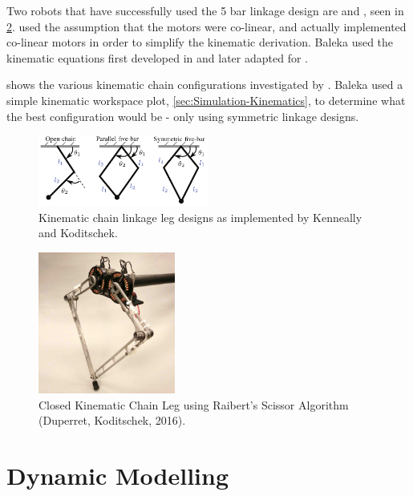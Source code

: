 Two robots that have successfully used the 5 bar linkage design are \cite{Kenneally2016} and \cite{Duperret}, seen in \cref{fig:pen-state-scissor}. \cite{Duperret} used the assumption that the motors were co-linear, and \cite{Kenneally2016} actually implemented co-linear motors in order to simplify the kinematic derivation. Baleka used the kinematic equations first developed in \cite{Kenneally2016} and later adapted for \cite{Duperret}. 

 shows the various kinematic chain configurations investigated by \cite{Kenneally2016}. Baleka used a simple kinematic workspace plot, \cref{sec:Simulation-Kinematics}, to determine what the best configuration would be - only using symmetric linkage designs.

\begin{figure}
\centering
\includegraphics[width=0.5\textwidth]{images/literature/closed-kinematic-chain-Koditschek.png} 
\caption{Kinematic chain linkage leg designs as implemented by Kenneally and Koditschek.\cite{Kenneally2016}}
\label{fig:Kinematic chain linkage leg designs}
\end{figure}

\begin{figure}
\centering
\includegraphics[width=0.4\textwidth]{images/literature/pen-state-scissor.jpg} 
\caption{Closed Kinematic Chain Leg using Raibert's Scissor Algorithm (Duperret, Koditschek, 2016).\cite{Duperret}}
\label{fig:pen-state-scissor}
\end{figure}

\section{Dynamic Modelling}

